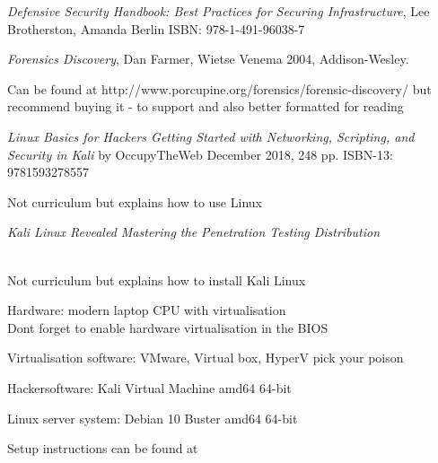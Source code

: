 \documentclass[Screen16to9,17pt]{foils}
\begin{document}
{\footnotesize{}}



\emph{Defensive Security Handbook: Best Practices for Securing Infrastructure}, Lee Brotherston, Amanda Berlin ISBN: 978-1-491-96038-7



\emph{Forensics Discovery}, Dan Farmer, Wietse Venema 2004, Addison-Wesley.

Can be found at http://www.porcupine.org/forensics/forensic-discovery/ but recommend buying it - to support and also better formatted for reading




\emph{Linux Basics for Hackers
Getting Started with Networking, Scripting, and Security in Kali}
by OccupyTheWeb
December 2018, 248 pp.
ISBN-13:
9781593278557

Not curriculum but explains how to use Linux



\emph{Kali Linux Revealed  Mastering the Penetration Testing Distribution}

\\
Not curriculum but explains how to install Kali Linux







\begin{list2}
\item Hardware: modern laptop CPU with virtualisation\\
Dont forget to enable hardware virtualisation in the BIOS
\item Virtualisation software: VMware, Virtual box, HyperV pick your poison
\item Hackersoftware: Kali Virtual Machine amd64 64-bit 
\item Linux server system: Debian 10 Buster amd64 64-bit 
\item Setup instructions can be found at 
\end{list2}
\end{document}
